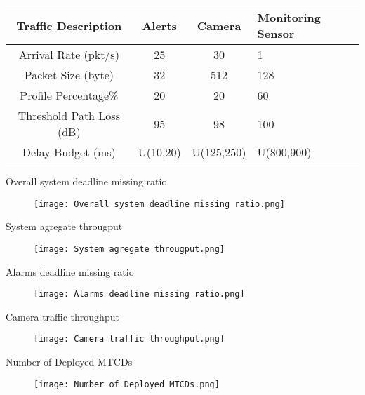 \documentclass{beamer}
\begin{document}
\begin{frame}{}
    \begin{block}{}
    \begin{table}[]
        \centering
        \renewcommand{\arraystretch}{1.4}
        \begin{tabular}{||c|c|c|m{2cm}||}
            \hline
            Traffic Description & Alerts & Camera & Monitoring Sensor \\ 
            \hline
            \hline
            Arrival Rate (pkt/s) & 25 & 30 & 1\\ 
            \hline
            Packet Size (byte) & 32 & 512 & 128\\ 
            \hline
            Profile Percentage\% & 20 & 20 & 60\\
            \hline
            Threshold Path Loss (dB) & 95 & 98 & 100\\
            \hline
            Delay Budget (ms) & U(10,20) & U(125,250) & U(800,900)\\
            \hline
        \end{tabular}
        \label{tab:Table3}
    \end{table}
    \end{block}
\end{frame}
\begin{frame}{Overall system deadline missing ratio}
    \begin{figure}[h!]
    \centering
    \texttt{[image: Overall system deadline missing ratio.png]}
    \label{fig:overalldeadline}
    \end{figure}
\end{frame}
\begin{frame}{System agregate througput}
    \begin{figure}[h!]
    \centering
    \texttt{[image: System agregate througput.png]}
    \label{fig:systemthroughput}
    \end{figure}
\end{frame}
\begin{frame}{Alarms deadline missing ratio}
    \begin{figure}[h!]
    \centering
    \texttt{[image: Alarms deadline missing ratio.png]}
    \label{fig:systemthroughput}
    \end{figure}
\end{frame}
\begin{frame}{Camera traffic throughput}
    \begin{figure}[h!]
    \centering
    \texttt{[image: Camera traffic throughput.png]}
    \label{fig:systemthroughput}
    \end{figure}
\end{frame}
\begin{frame}{Number of Deployed MTCDs}
    \begin{figure}[h!]
    \centering
    \texttt{[image: Number of Deployed MTCDs.png]}
    \label{fig:systemthroughput}
    \end{figure}
\end{frame}
\end{document}
